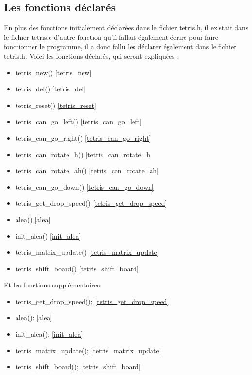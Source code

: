 \documentclass[a4paper,10p]{report}
\begin{document}
\subsection{Les fonctions déclarés}
En plus des fonctions initialement déclarées dans le fichier tetris.h, il existait dans le fichier tetris.c d'autre fonction qu'il fallait également écrire pour faire fonctionner le programme, il a donc fallu les déclarer également dans le fichier tetris.h. Voici les fonctions déclarés, qui seront expliquées :

\begin{itemize}
\item tetris\_new() \ref{tetris_new}
\item tetris\_del() \ref{tetris_del}
\item tetris\_reset() \ref{tetris_reset}
\item tetris\_can\_go\_left() \ref{tetris_can_go_left}
\item tetris\_can\_go\_right() \ref{tetris_can_go_right}
\item tetris\_can\_rotate\_h() \ref{tetris_can_rotate_h}
\item tetris\_can\_rotate\_ah() \ref{tetris_can_rotate_ah}
\item tetris\_can\_go\_down() \ref{tetris_can_go_down}
\item tetris\_get\_drop\_speed() \ref{tetris_get_drop_speed}
\item alea() \ref{alea}
\item init\_alea() \ref{init_alea}
\item tetris\_matrix\_update() \ref{tetris_matrix_update}
\item tetris\_shift\_board() \ref{tetris_shift_board}
\end{itemize}
Et les fonctions supplémentaires:
\begin{itemize}
\item tetris\_get\_drop\_speed(); \ref{tetris_get_drop_speed}
\item alea(); \ref{alea}
\item init\_alea(); \ref{init_alea}
\item tetris\_matrix\_update(); \ref{tetris_matrix_update}
\item tetris\_shift\_board(); \ref{tetris_shift_board}
\end{itemize}
\end{document}
